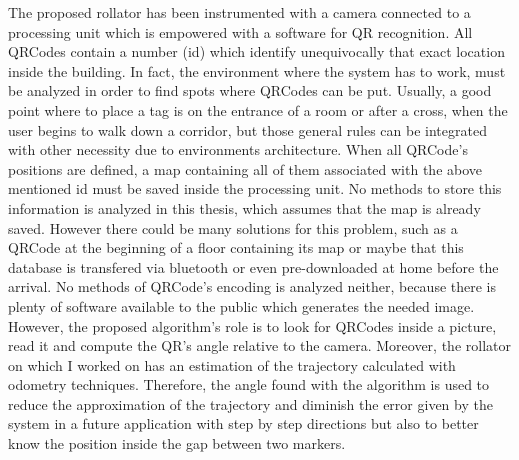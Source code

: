 The proposed rollator has been instrumented with a camera connected to a processing unit which is empowered with a software for QR recognition.
All QRCodes contain a number (id) which identify unequivocally that exact location inside the building. In fact, the environment where the system has to work, must be analyzed in order to find spots where QRCodes can be put.
Usually, a good point where to place a tag is on the entrance of a room or after a cross, when the user begins to walk down a corridor, but those general rules can be integrated with other necessity due to environments architecture. 
When all QRCode's positions are defined, a map containing all of them associated with the above mentioned id must be saved inside the processing unit.\newline
No methods to store this information is analyzed in this thesis, which assumes that the map is already saved. However there could be many solutions for this problem, such as a QRCode at the beginning of a floor containing its map or maybe that this database is transfered via bluetooth or even pre-downloaded at home before the arrival. No methods of QRCode's encoding is analyzed neither, because there is plenty of software available to the public which generates the needed image.
\newline
However, the proposed algorithm's role is to look for QRCodes inside a picture, read it and compute the QR's angle relative to the camera. Moreover, the rollator on which I worked on has an estimation of the trajectory calculated with odometry techniques. Therefore, the angle found with the algorithm is used to reduce the approximation of the trajectory and diminish the error given by the system in a future application with step by step directions but also to better know the position inside the gap between two markers.






   













  
